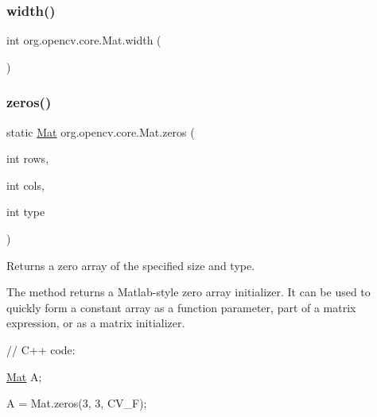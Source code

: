 \subsubsection{\texorpdfstring{width()}{width()}}
{\footnotesize\ttfamily int org.\+opencv.\+core.\+Mat.\+width (\begin{DoxyParamCaption}{ }\end{DoxyParamCaption})}

\mbox{\label{classorg_1_1opencv_1_1core_1_1_mat_aff41070138369b96f792b19f01ab00d9}} 
\subsubsection{\texorpdfstring{zeros()}{zeros()}\hspace{0.1cm}{\footnotesize\ttfamily [1/2]}}
{\footnotesize\ttfamily static \mbox{\hyperlink{classorg_1_1opencv_1_1core_1_1_mat}{Mat}} org.\+opencv.\+core.\+Mat.\+zeros (\begin{DoxyParamCaption}\item[{int}]{rows,  }\item[{int}]{cols,  }\item[{int}]{type }\end{DoxyParamCaption})\hspace{0.3cm}{\ttfamily [static]}}

Returns a zero array of the specified size and type.

The method returns a Matlab-\/style zero array initializer. It can be used to quickly form a constant array as a function parameter, part of a matrix expression, or as a matrix initializer. {\ttfamily }

{\ttfamily }

{\ttfamily }

{\ttfamily // C++ code\+:}

{\ttfamily }

{\ttfamily }

{\ttfamily \mbox{\hyperlink{classorg_1_1opencv_1_1core_1_1_mat}{Mat}} A;}

{\ttfamily }

{\ttfamily }

{\ttfamily A = Mat.\+zeros(3, 3, C\+V\+\_\+F);}

{\ttfamily }


